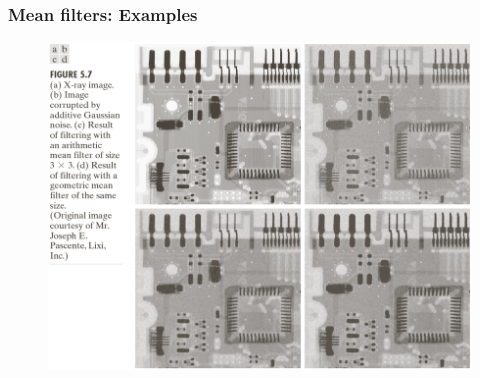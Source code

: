 \documentclass[english,11pt,table,handout]{beamer}
\begin{document}
\frame
{
	\frametitle{Mean filters: Examples }
	\begin{figure}[!h]
		\includegraphics[scale=0.7]{arith_geo_mean.png}
	\end{figure}
	
}
\end{document}
